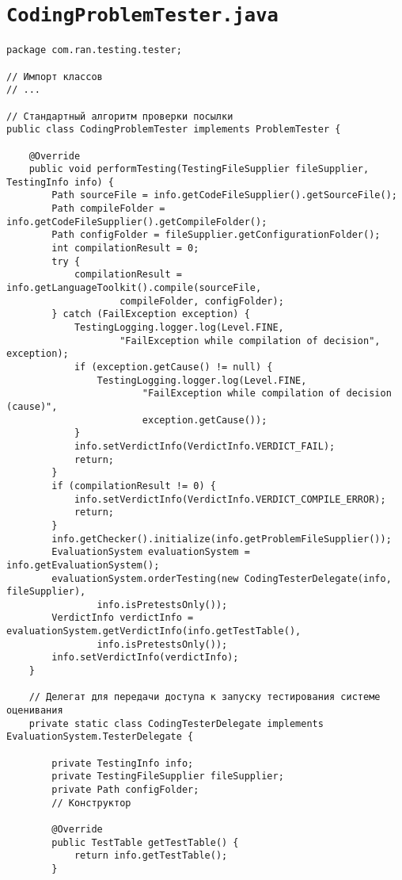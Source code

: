 \section*{\texttt{CodingProblemTester.java}}
\begin{verbatim}
package com.ran.testing.tester;

// Импорт классов
// ...

// Стандартный алгоритм проверки посылки
public class CodingProblemTester implements ProblemTester {

    @Override
    public void performTesting(TestingFileSupplier fileSupplier, TestingInfo info) {
        Path sourceFile = info.getCodeFileSupplier().getSourceFile();
        Path compileFolder = info.getCodeFileSupplier().getCompileFolder();
        Path configFolder = fileSupplier.getConfigurationFolder();
        int compilationResult = 0;
        try {
            compilationResult = info.getLanguageToolkit().compile(sourceFile,
                    compileFolder, configFolder);
        } catch (FailException exception) {
            TestingLogging.logger.log(Level.FINE,
                    "FailException while compilation of decision", exception);
            if (exception.getCause() != null) {
                TestingLogging.logger.log(Level.FINE,
                        "FailException while compilation of decision (cause)",
                        exception.getCause());
            }
            info.setVerdictInfo(VerdictInfo.VERDICT_FAIL);
            return;
        }
        if (compilationResult != 0) {
            info.setVerdictInfo(VerdictInfo.VERDICT_COMPILE_ERROR);
            return;
        }
        info.getChecker().initialize(info.getProblemFileSupplier());
        EvaluationSystem evaluationSystem = info.getEvaluationSystem();
        evaluationSystem.orderTesting(new CodingTesterDelegate(info, fileSupplier),
                info.isPretestsOnly());
        VerdictInfo verdictInfo = evaluationSystem.getVerdictInfo(info.getTestTable(),
                info.isPretestsOnly());
        info.setVerdictInfo(verdictInfo);
    }
    
    // Делегат для передачи доступа к запуску тестирования системе оценивания
    private static class CodingTesterDelegate implements EvaluationSystem.TesterDelegate {

        private TestingInfo info;
        private TestingFileSupplier fileSupplier;
        private Path configFolder;
        // Конструктор
        
        @Override
        public TestTable getTestTable() {
            return info.getTestTable();
        }


\end{verbatim}
